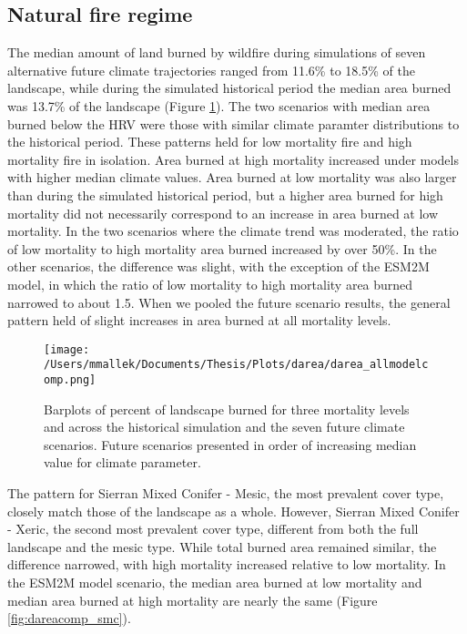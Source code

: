 \documentclass[12pt]{article}
\begin{document}
\begin{spacing}{1}
\subsection*{Natural fire regime}
The median amount of land burned by wildfire during simulations of seven alternative future climate trajectories ranged from 11.6\% to 18.5\% of the landscape, while during the simulated historical period the median area burned was 13.7\% of the landscape (Figure \ref{darea_modelcomp}). The two scenarios with median area burned below the HRV were those with similar climate paramter distributions to the historical period. These patterns held for low mortality fire and high mortality fire in isolation. Area burned at high mortality increased under models with higher median climate values. Area burned at low mortality was also larger than during the simulated historical period, but a higher area burned for high mortality did not necessarily correspond to an increase in area burned at low mortality. In the two scenarios where the climate trend was moderated, the ratio of low mortality to high mortality area burned increased by over 50\%. In the other scenarios, the difference was slight, with the exception of the ESM2M model, in which the ratio of low mortality to high mortality area burned narrowed to about 1.5. When we pooled the future scenario results, the general pattern held of slight increases in area burned at all mortality levels.

\begin{figure}[!htbp]
\centering
\texttt{[image: /Users/mmallek/Documents/Thesis/Plots/darea/darea\_allmodelcomp.png]}
\caption{Barplots of percent of landscape burned for three mortality levels and across the historical simulation and the seven future climate scenarios. Future scenarios presented in order of increasing median value for climate parameter.}
\label{darea_modelcomp}
\end{figure}

The pattern for Sierran Mixed Conifer - Mesic, the most prevalent cover type, closely match those of the landscape as a whole. However, Sierran Mixed Conifer - Xeric, the second most prevalent cover type, different from both the full landscape and the mesic type. While total burned area remained similar, the difference narrowed, with high mortality increased relative to low mortality. In the ESM2M model scenario, the median area burned at low mortality and median area burned at high mortality are nearly the same (Figure \ref{fig:dareacomp_smc}). 


\end{spacing}
\end{document}
